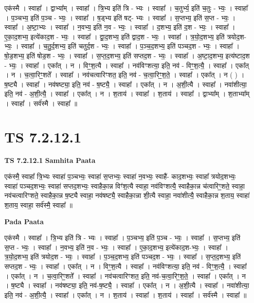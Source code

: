 \documentclass[17pt]{extarticle}
\begin{document}
एक॑स्मै । स्वाहा᳚ । द्वाभ्या᳚म् । स्वाहा᳚ । त्रि॒भ्य इति॑ त्रि - भ्यः । स्वाहा᳚ । च॒तुर्भ्य॒ इति॑ च॒तुः - भ्यः॒ । स्वाहा᳚ । प॒ञ्चभ्य॒ इति॑ प॒ञ्च - भ्यः॒ । स्वाहा᳚ । ष॒ड्भ्य इति॑ षट्- भ्यः । स्वाहा᳚ । स॒प्तभ्य॒ इति॑ स॒प्त - भ्यः॒ । स्वाहा᳚ । अ॒ष्टा॒भ्यः । स्वाहा᳚ । न॒वभ्य॒ इति॑ न॒व - भ्यः॒ । स्वाहा᳚ । द॒शभ्य॒ इति॑ द॒श - भ्यः॒ । स्वाहा᳚ । ए॒का॒द॒शभ्य॒ इत्ये॑काद॒श - भ्यः॒ । स्वाहा᳚ । द्वा॒द॒शभ्य॒ इति॑ द्वाद॒श - भ्यः॒ । स्वाहा᳚ । त्र॒यो॒द॒शभ्य॒ इति॑ त्रयोद॒श-भ्यः॒ । स्वाहा᳚ । च॒तु॒र्द॒शभ्य॒ इति॑ चतुर्द॒श - भ्यः॒ । स्वाहा᳚ । प॒ञ्च॒द॒शभ्य॒ इति॑ पञ्चद॒श - भ्यः॒ । स्वाहा᳚ । षो॒ड॒शभ्य॒ इति॑ षोड॒श - भ्यः॒ । स्वाहा᳚ । स॒प्त॒द॒शभ्य॒ इति॑ सप्तद॒श - भ्यः॒ । स्वाहा᳚ । अ॒ष्टा॒द॒शभ्य॒ इत्य॑ष्टाद॒श - भ्यः॒ । स्वाहा᳚ । एका᳚त् । न । विꣳ॒॒श॒त्यै । स्वाहा᳚ । नव॑विꣳशत्या॒ इति॒ नव॑ - विꣳ॒॒श॒त्यै॒ । स्वाहा᳚ । एका᳚त् । न । च॒त्वा॒रिꣳ॒॒शते᳚ । स्वाहा᳚ । नव॑चत्वारिꣳशत॒ इति॒ नव॑ - च॒त्वा॒रिꣳ॒॒श॒ते॒ । स्वाहा᳚ । एका᳚त् । न ( ) । ष॒ष्ट्यै । स्वाहा᳚ । नव॑षष्ट्या॒ इति॒ नव॑ - ष॒ष्ट्यै॒ । स्वाहा᳚ । एका᳚त् । न । अ॒शी॒त्यै । स्वाहा᳚ । नवा॑शीत्या॒ इति॒ नव॑ - अ॒शी॒त्यै॒ । स्वाहा᳚ । एका᳚त् । न । श॒ताय॑ । स्वाहा᳚ । श॒ताय॑ । स्वाहा᳚ । द्वाभ्या᳚म् । श॒ताभ्या᳚म् । स्वाहा᳚ । सर्व॑स्मै । स्वाहा᳚ ॥  \newline




\section*{ TS 7.2.12.1 }

\textbf{TS 7.2.12.1 } \newline
\textbf{Samhita Paata} \newline

एक॑स्मै॒ स्वाहा᳚ त्रि॒भ्यः स्वाहा॑ प॒ञ्चभ्यः॒ स्वाहा॑ स॒प्तभ्यः॒ स्वाहा॑ न॒वभ्यः॒ स्वाहै॑- काद॒शभ्यः॒ स्वाहा᳚ त्रयोद॒शभ्यः॒ स्वाहा॑ पञ्चद॒शभ्यः॒ स्वाहा॑ सप्तद॒शभ्यः॒ स्वाहैका॒न्न विꣳ॑श॒त्यै स्वाहा॒ नव॑विꣳशत्यै॒ स्वाहैका॒न्न च॑त्वारिꣳ॒॒शते॒ स्वाहा॒ नव॑चत्वारिꣳशते॒ स्वाहैका॒न्न ष॒ष्ट्यै स्वाहा॒ नव॑षष्ट्यै॒ स्वाहैका॒न्ना शी॒त्यै स्वाहा॒ नवा॑शीत्यै॒ स्वाहैका॒न्न श॒ताय॒ स्वाहा॑ श॒ताय॒ स्वाहा॒ सर्व॑स्मै॒ स्वाहा᳚ ॥ \newline

\textbf{Pada Paata} \newline

एक॑स्मै । स्वाहा᳚ । त्रि॒भ्य इति॑ त्रि - भ्यः । स्वाहा᳚ । प॒ञ्चभ्य॒ इति॑ प॒ञ्च - भ्यः॒ । स्वाहा᳚ । स॒प्तभ्य॒ इति॑ स॒प्त - भ्यः॒ । स्वाहा᳚ । न॒वभ्य॒ इति॑ न॒व - भ्यः॒ । स्वाहा᳚ । ए॒का॒द॒शभ्य॒ इत्ये॑काद॒श-भ्यः॒ । स्वाहा᳚ । त्र॒यो॒द॒शभ्य॒ इति॑ त्रयोद॒श - भ्यः॒ । स्वाहा᳚ । प॒ञ्च॒द॒शभ्य॒ इति॑ पञ्चद॒श - भ्यः॒ । स्वाहा᳚ । स॒प्त॒द॒शभ्य॒ इति॑ सप्तद॒श - भ्यः॒ । स्वाहा᳚ । एका᳚त् । न । विꣳ॒॒श॒त्यै । स्वाहा᳚ । नव॑विꣳशत्या॒ इति॒ नव॑ - विꣳ॒॒श॒त्यै॒ । स्वाहा᳚ । एका᳚त् । न । च॒त्वा॒रिꣳ॒॒शते᳚ । स्वाहा᳚ । नव॑चत्वारिꣳशत॒ इति॒ नव॑-च॒त्वा॒रिꣳ॒॒श॒ते॒ । स्वाहा᳚ । एका᳚त् । न । ष॒ष्ट्यै । स्वाहा᳚ । नव॑षष्ट्या॒ इति॒ नव॑-ष॒ष्ट्यै॒ । स्वाहा᳚ । एका᳚त् । न । अ॒शी॒त्यै । स्वाहा᳚ । नवा॑शीत्या॒ इति॒ नव॑ - अ॒शी॒त्यै॒ । स्वाहा᳚ । एका᳚त् । न । श॒ताय॑ । स्वाहा᳚ । श॒ताय॑ । स्वाहा᳚ । सर्व॑स्मै । स्वाहा᳚ ॥  \newline
\end{document}
